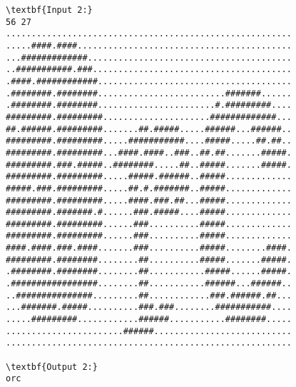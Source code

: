 \begin{verbatim}
\textbf{Input 2:}
56 27
........................................................
.....####.####..........................................
...#############........................................
..###########.###.......................................
.####.############......................................
.########.########.........................#######......
.########.########.......................#.#########....
#########.#########.....................#############...
##.######.#########.......##.#####.....######...######..
#########.#########.....###########....#####.....##.##..
#########.#########...####.####..###..##.##.......#####.
#########.###.#####..########.....##..#####.......#####.
#########.#########.....#####.######..#####.............
#####.###.#########.....##.#.#######..#####.............
#########.#########.....####.###.##...#####.............
#########.#######.#......###.#####....#####.............
#########.#########......###..........#####.............
#########.#########......###..........#####.............
####.####.###.####.......###..........#####........####.
#########.########........##..........#####.......#####.
.########.########........##...........#####......#####.
.#################........##...........######...######..
..###############.........##............###.######.##...
...#######.#####..........###.###........###########....
.....#########............######...........########.....
.......................######...........................
........................................................

\textbf{Output 2:}
orc
\end{verbatim}
